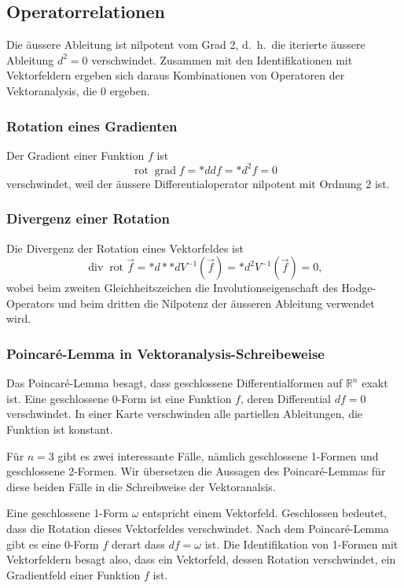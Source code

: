 %
%
\subsection{Operatorrelationen}
Die äussere Ableitung ist nilpotent vom Grad 2, d.~h.~die iterierte
äussere Ableitung $d^2=0$ verschwindet.
Zusammen mit den Identifikationen mit Vektorfeldern ergeben sich
daraus Kombinationen von Operatoren der Vektoranalysis, die
0 ergeben.

\subsubsection{Rotation eines Gradienten}
Der Gradient einer Funktion $f$ ist
\[
\operatorname{rot}\operatorname{grad}f
=
*{d}df
=
*d^2f
=
0
\]
verschwindet, weil der äussere Differentialoperator nilpotent mit
Ordnung $2$ ist.

\subsubsection{Divergenz einer Rotation}
Die Divergenz der Rotation eines Vektorfeldes ist
\[
\operatorname{div}\operatorname{rot} \vec{f}
=
*{d}{*}{*}d V^{-1}(\vec{f})
=
*d^2 V^{-1}(\vec{f})
=
0,
\]
wobei beim zweiten Gleichheitszeichen die Involutionseigenschaft
des Hodge-Operators und beim dritten die Nilpotenz der äusseren Ableitung
verwendet wird.

\subsubsection{Poincaré-Lemma in Vektoranalysis-Schreibeweise}
Das Poincaré-Lemma besagt, dass geschlossene Differentialformen auf
$\mathbb{R}^n$ exakt ist.
Eine geschlossene 0-Form ist eine Funktion $f$, deren Differential
$df=0$ verschwindet.
In einer Karte verschwinden alle partiellen Ableitungen, die Funktion
ist konstant.

Für $n=3$ gibt es zwei interessante Fälle, nämlich geschlossene 1-Formen
und geschlossene 2-Formen.
Wir übersetzen die Aussagen des Poincaré-Lemmas für diese beiden
Fälle in die Schreibweise der Vektoranalsis.

Eine geschlossene 1-Form $\omega$ entspricht einem Vektorfeld.
Geschlossen bedeutet, dass die Rotation dieses Vektorfeldes verschwindet.
Nach dem Poincaré-Lemma gibt es eine 0-Form $f$ derart dass
$df=\omega$ ist.
Die Identifikation von 1-Formen mit Vektorfeldern besagt also, dass
ein Vektorfeld, dessen Rotation verschwindet, ein Gradientfeld
einer Funktion $f$ ist.

